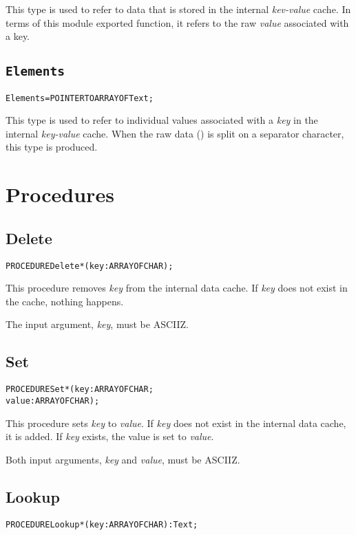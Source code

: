 This type is used to refer to data that is stored in the internal
\emph{kev-value} cache.  In terms of this module exported function, it
refers to the raw \emph{value} associated with a key.

\subsection{\texttt{Elements}}\label{environment:elements}
\begin{alltt}
Elements = POINTER TO ARRAY OF Text;
\end{alltt}

This type is used to refer to individual values associated with a
\emph{key} in the internal \emph{key-value} cache.  When the raw data
() is split on a separator character, this type
is produced.


\section{Procedures}

\subsection{Delete}
\begin{alltt}
  PROCEDURE Delete*(key : ARRAY OF CHAR);
\end{alltt}

This procedure removes \emph{key} from the internal data cache.  If
\emph{key} does not exist in the cache, nothing happens.

The input argument, \emph{key}, must be ASCIIZ.

\subsection{Set}
\begin{alltt}
  PROCEDURE Set*(key   : ARRAY OF CHAR;
                 value : ARRAY OF CHAR);
\end{alltt}

This procedure sets \emph{key} to \emph{value}.  If \emph{key} does not
exist in the internal data cache, it is added.  If \emph{key} exists,
the value is set to \emph{value}.

Both input arguments, \emph{key} and \emph{value}, must be ASCIIZ.

\subsection{Lookup}
\begin{alltt}
  PROCEDURE Lookup*(key : ARRAY OF CHAR) : Text;
\end{alltt}

